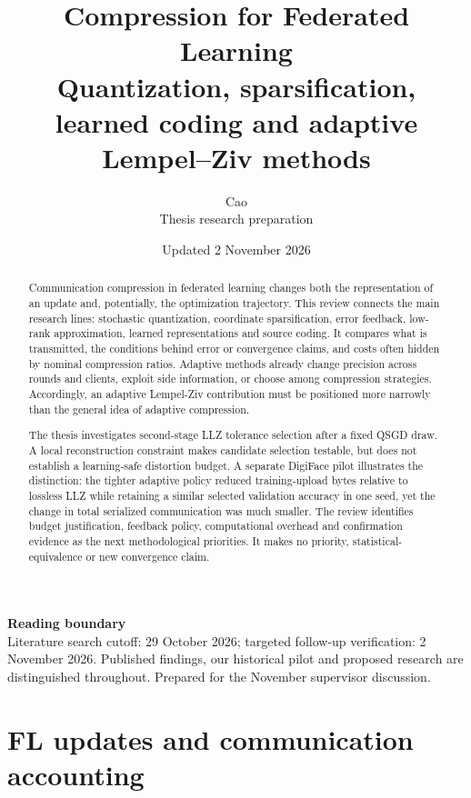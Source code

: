 \documentclass[11pt,a4paper]{article}
\title{Compression for Federated Learning\\[3pt]\large Quantization, sparsification, learned coding and adaptive Lempel--Ziv methods}
\author{Cao\\\normalsize Thesis research preparation}
\date{Updated 2 November 2026}
\begin{document}
\maketitle

\begin{reviewcallout}\textbf{Reading boundary}\\Literature search cutoff: 29 October 2026; targeted follow-up verification: 2 November 2026. Published findings, our historical pilot and proposed research are distinguished throughout. Prepared for the November supervisor discussion.\end{reviewcallout}

\begin{abstract}

Communication compression in federated learning changes both the representation of an update and, potentially, the optimization trajectory. This review connects the main research lines: stochastic quantization, coordinate sparsification, error feedback, low-rank approximation, learned representations and source coding. It compares what is transmitted, the conditions behind error or convergence claims, and costs often hidden by nominal compression ratios. Adaptive methods already change precision across rounds and clients, exploit side information, or choose among compression strategies. Accordingly, an adaptive Lempel-Ziv contribution must be positioned more narrowly than the general idea of adaptive compression.

The thesis investigates second-stage LLZ tolerance selection after a fixed QSGD draw. A local reconstruction constraint makes candidate selection testable, but does not establish a learning-safe distortion budget. A separate DigiFace pilot illustrates the distinction: the tighter adaptive policy reduced training-upload bytes relative to lossless LLZ while retaining a similar selected validation accuracy in one seed, yet the change in total serialized communication was much smaller. The review identifies budget justification, feedback policy, computational overhead and confirmation evidence as the next methodological priorities. It makes no priority, statistical-equivalence or new convergence claim.

\end{abstract}

\tableofcontents\clearpage

\section{FL updates and communication accounting}
\end{document}
